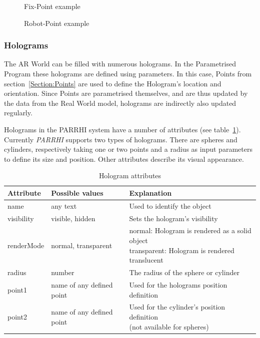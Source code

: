 \begin{figure}[!h]
	\begin{minipage}{0.45\textwidth}
		\centering
		
		\caption{Fix-Point example}
		\label{InputData:PointFix}
	\end{minipage}\hfill
	\begin{minipage}{0.45\textwidth}
		\centering
		
		\caption{Robot-Point example}
		\label{InputData:PointRobot}
	\end{minipage}
\end{figure}

\subsubsection{Holograms}\label{Section:Holograms}
The AR World can be filled with numerous holograms. In the Parametrised Program these holograms are defined using parameters. In this case, Points from section~\ref{Section:Points} are used to define the Hologram's location and orientation. Since Points are parametrised themselves, and are thus updated by the data from the Real World model, holograms are indirectly also updated regularly.

Holograms in the PARRHI system have a number of attributes (see table~\ref{Table:HologramAttributes}). Currently \textit{PARRHI} supports two types of holograms. There are spheres and cylinders, respectively taking one or two points and a radius as input parameters to define its size and position. Other attributes describe its visual appearance.

\begin{table}[!htbp]
	\caption{Hologram attributes}
	\label{Table:HologramAttributes}
	\centering
	\begin{tabular}{lll}
		\toprule
		Attribute & Possible values		& Explanation	\\		
		\midrule
		name & any text & Used to identify the object \\
		visibility & visible, hidden & Sets the hologram's visibility \\
		renderMode & normal, transparent & \parbox[t]{10cm}{ normal: Hologram is rendered as a solid object \\ transparent: Hologram is rendered translucent}\\
		radius & number & The radius of the sphere or cylinder \\
		point1 & name of any defined point & Used for the holograms position definition \\
		point2 & name of any defined point & \parbox[t]{10cm}{ Used for the cylinder's position definition \\ (not available for spheres)} \\
		\bottomrule
	\end{tabular}
\end{table}

